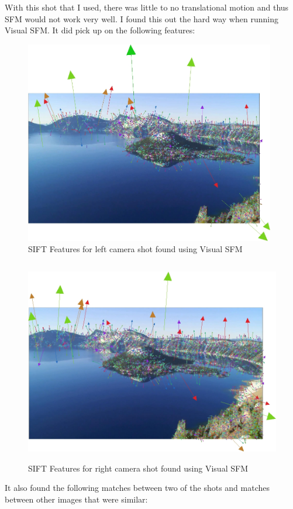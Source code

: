 \documentclass[11pt,psfig]{article}
\begin{document}
With this shot that I used, there was little to no translational motion and thus SFM would not work very well. I found this out the hard way when running Visual SFM. It did pick up on the following features:
\begin{figure}[H]
\centering
\includegraphics[height=3.5in]{sfmResults1/shotFeatures_4.jpg}
\caption{SIFT Features for left camera shot found using Visual SFM}
\end{figure}
\begin{figure}[H]
\centering
\includegraphics[height=3.5in]{sfmResults1/shotFeatures_26.jpg}
\caption{SIFT Features for right camera shot found using Visual SFM}
\end{figure}
It also found the following matches between two of the shots and matches between other images that were similar:
\end{document}
